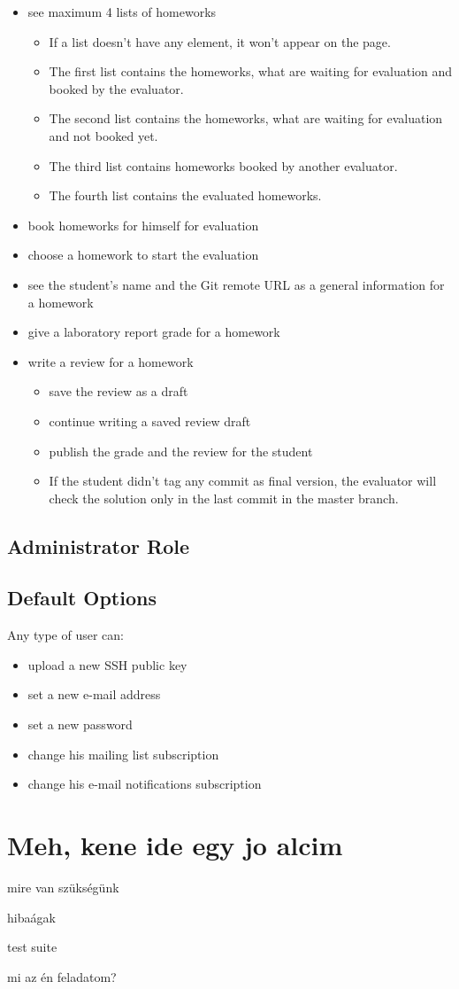 \begin{itemize}
	\item see maximum 4 lists of homeworks
	\begin{itemize}
		\item If a list doesn't have any element, it won't appear on the page.
		\item The first list contains the homeworks, what are waiting for evaluation and booked by the evaluator. 
		\item The second list contains the homeworks, what are waiting for evaluation and not booked yet. 
		\item The third list contains homeworks booked by another evaluator. 
		\item The fourth list contains the evaluated homeworks. 
	\end{itemize}
	\item book homeworks for himself for evaluation
	\item choose a homework to start the evaluation
	\item see the student's name and the Git remote URL as a general information for a homework
	\item give a laboratory report grade for a homework
	\item write a review for a homework
		\begin{itemize}
			\item save the review as a draft
			\item continue writing a saved review draft
			\item publish the grade and the review for the student
			\item If the student didn't tag any commit as final version, the evaluator will check the solution only in the last commit in the master branch.
		\end{itemize}
\end{itemize}

\subsection{Administrator Role}

\subsection{Default Options}

Any type of user can:

\begin{itemize}
	\item upload a new SSH public key
	\item set a new e-mail address
	\item set a new password
	\item change his mailing list subscription
	\item change his e-mail notifications subscription
\end{itemize}

\section{Meh, kene ide egy jo alcim}

mire van szükségünk

hibaágak

test suite

mi az én feladatom?